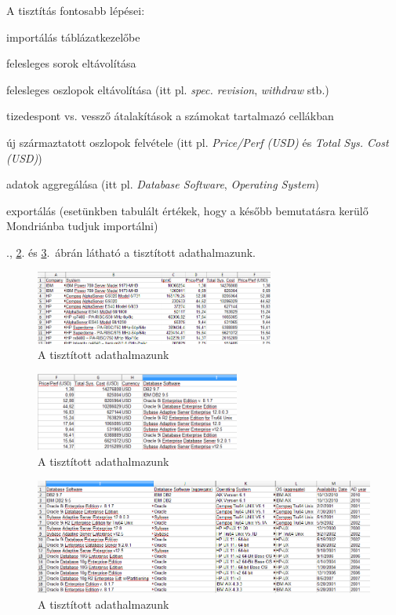 \documentclass[a4paper,10pt,titlepage]{article}
\newenvironment{sajat_itemize}
{
	\begin{itemize}
	\setlength{\itemsep}{0pt}
}
{
	\end{itemize}
}
\begin{document}
A tisztítás fontosabb lépései:

\begin{sajat_itemize}
\item importálás táblázatkezelőbe
\item felesleges sorok eltávolítása
\item felesleges oszlopok eltávolítása (itt pl. \emph{spec. revision}, \emph{withdraw} stb.)
\item tizedespont vs. vessző átalakítások a számokat tartalmazó cellákban
\item új származtatott oszlopok felvétele (itt pl. \emph{Price/Perf (USD)} és \emph{Total Sys. Cost (USD)})
\item adatok aggregálása (itt pl. \emph{Database Software}, \emph{Operating System})
\item exportálás (esetünkben tabulált értékek, hogy a később bemutatásra kerülő Mondriánba tudjuk importálni)
\end{sajat_itemize}

., \ref{fig:tpc_cleaned_002}. és \ref{fig:tpc_cleaned_003}.~ábrán látható a tisztított adathalmazunk.

\begin{figure}[h!]
\centering
\includegraphics[width=0.70\textwidth]{figures/tpc_cleaned_001.png}
\caption{A tisztított adathalmazunk \label{fig:tpc_cleaned_001}}
\end{figure}

\begin{figure}[h!]
\centering
\includegraphics[width=0.60\textwidth]{figures/tpc_cleaned_002.png}
\caption{A tisztított adathalmazunk \label{fig:tpc_cleaned_002}}
\end{figure}

\begin{figure}[h!]
\centering
\includegraphics[width=1.00\textwidth]{figures/tpc_cleaned_003.png}
\caption{A tisztított adathalmazunk \label{fig:tpc_cleaned_003}}
\end{figure}
\end{document}
